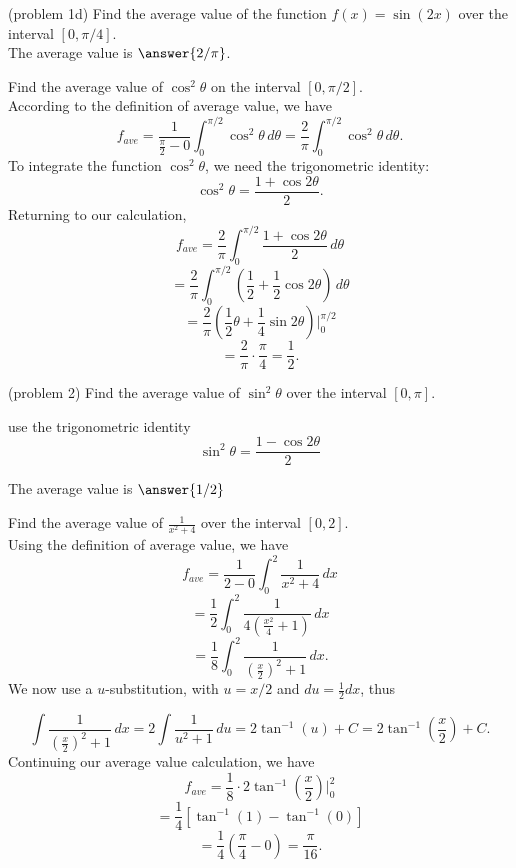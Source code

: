 \documentclass[handout]{ximera}
\begin{document}
\begin{problem}(problem 1d)
Find the average value of the function $f(x) = \sin(2x)$ over the interval $[0, \pi/4]$.\\
The average value is $\answer{2/\pi}$.
\end{problem}



\begin{example}[example 2] Find the average value of $\cos^2\theta$ on the interval $[0, \pi/2]$.\\
According to the definition of average value, we have
\[
f_{ave} = \frac{1}{\frac{\pi}{2} - 0} \int_0^{\pi/2} \cos^2 \theta \, d\theta = \frac{2}{\pi} \int_0^{\pi/2} \cos^2 \theta \, d\theta.
\]
To integrate the function $\cos^2 \theta$, we need the trigonometric identity:
\[
\cos^2 \theta = \frac{1 + \cos 2\theta}{2}.
\]
Returning to our calculation,
\[
f_{ave} = \frac{2}{\pi} \int_0^{\pi/2} \frac{1 + \cos 2\theta}{2} \, d\theta
\]
\[
 = \frac{2}{\pi} \int_0^{\pi/2} \left(\frac12 + \frac12\cos 2\theta\right) \, d\theta
\]
\[
= \frac{2}{\pi} \left(\frac12 \theta + \frac14 \sin 2\theta \right) \bigg|_0^{\pi/2}
\]
\[
=\frac{2}{\pi} \cdot \frac{\pi}{4} = \frac12.
\]


\end{example}



\begin{problem}(problem 2)
Find the average value of $\sin^2 \theta$ over the interval $[0, \pi]$.\\

    \begin{hint}
      use the trigonometric identity $$\sin^2 \theta = \frac{1 - \cos 2\theta}{2}$$
    \end{hint}
    
		
The average value is $\answer{1/2}$
\end{problem}

\begin{example}[example 3]
Find the average value of $\displaystyle{\frac{1}{x^2 + 4}}$ over the interval $[0, 2]$.\\
Using the definition of average value, we have
\[
f_{ave} = \frac{1}{2-0} \int_0^2 \frac{1}{x^2 + 4} \, dx
\]
\[
= \frac12 \int_0^2 \frac{1}{4\left(\frac{x^2}{4} + 1\right)} \, dx
\]
\[
= \frac18 \int_0^2 \frac{1}{\left(\frac{x}{2}\right)^2 + 1} \, dx.
\]
We now use a $u$-substitution, with $u = x/2$ and $du = \frac12 dx$, thus

\[
\int \frac{1}{\left(\frac{x}{2}\right)^2 + 1} \, dx = 2\int\frac{1}{u^2 + 1} \, du = 2\tan^{-1}(u) + C = 2\tan^{-1}\left(\frac{x}{2}\right) + C.
\]
Continuing our average value calculation, we have
\[
f_{ave} = \frac18 \cdot 2\tan^{-1}\left(\frac{x}{2}\right) \bigg|_0^2
\]
\[
= \frac14 \left[\tan^{-1}(1) - \tan^{-1}(0)\right]
\]
\[
= \frac14 \left(\frac{\pi}{4} - 0\right) = \frac{\pi}{16}.
\]



\end{example}
\end{document}
